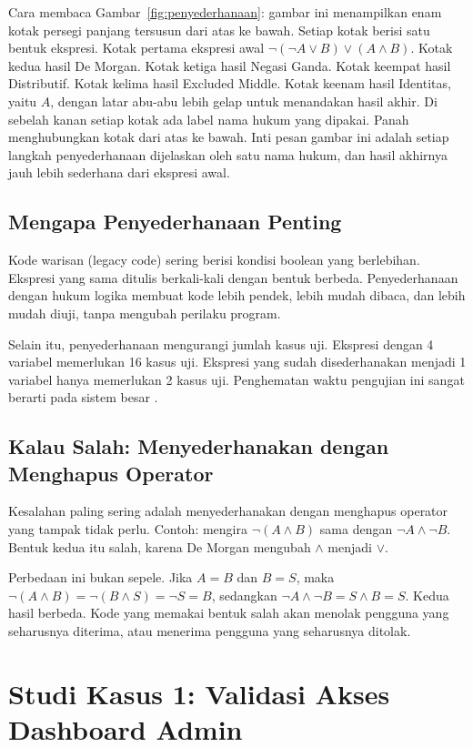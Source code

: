 \documentclass[11pt,a4paper]{article}
\begin{document}
Cara membaca Gambar~\ref{fig:penyederhanaan}: gambar ini menampilkan enam kotak persegi panjang tersusun dari atas ke bawah. Setiap kotak berisi satu bentuk ekspresi. Kotak pertama ekspresi awal $\neg(\neg A \vee B) \vee (A \wedge B)$. Kotak kedua hasil De Morgan. Kotak ketiga hasil Negasi Ganda. Kotak keempat hasil Distributif. Kotak kelima hasil Excluded Middle. Kotak keenam hasil Identitas, yaitu $A$, dengan latar abu-abu lebih gelap untuk menandakan hasil akhir. Di sebelah kanan setiap kotak ada label nama hukum yang dipakai. Panah menghubungkan kotak dari atas ke bawah. Inti pesan gambar ini adalah setiap langkah penyederhanaan dijelaskan oleh satu nama hukum, dan hasil akhirnya jauh lebih sederhana dari ekspresi awal.

\subsection{Mengapa Penyederhanaan Penting}

Kode warisan (legacy code) sering berisi kondisi boolean yang berlebihan. Ekspresi yang sama ditulis berkali-kali dengan bentuk berbeda. Penyederhanaan dengan hukum logika membuat kode lebih pendek, lebih mudah dibaca, dan lebih mudah diuji, tanpa mengubah perilaku program.

Selain itu, penyederhanaan mengurangi jumlah kasus uji. Ekspresi dengan 4 variabel memerlukan 16 kasus uji. Ekspresi yang sudah disederhanakan menjadi 1 variabel hanya memerlukan 2 kasus uji. Penghematan waktu pengujian ini sangat berarti pada sistem besar \cite{sommerville}.

\subsection{Kalau Salah: Menyederhanakan dengan Menghapus Operator}

Kesalahan paling sering adalah menyederhanakan dengan menghapus operator yang tampak tidak perlu. Contoh: mengira $\neg(A \wedge B)$ sama dengan $\neg A \wedge \neg B$. Bentuk kedua itu salah, karena De Morgan mengubah $\wedge$ menjadi $\vee$.

Perbedaan ini bukan sepele. Jika $A=B$ dan $B=S$, maka $\neg(A \wedge B)=\neg(B \wedge S)=\neg S=B$, sedangkan $\neg A \wedge \neg B=S \wedge B=S$. Kedua hasil berbeda. Kode yang memakai bentuk salah akan menolak pengguna yang seharusnya diterima, atau menerima pengguna yang seharusnya ditolak.

\section{Studi Kasus 1: Validasi Akses Dashboard Admin}
\end{document}
